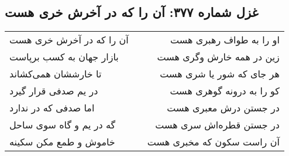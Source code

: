 \begin{center}
\section*{غزل شماره ۳۷۷: آن را که در آخرش خری هست}
\label{sec:0377}
\begin{longtable}{l p{0.5cm} r}
آن را که در آخرش خری هست
&&
او را به طواف رهبری هست
\\
بازار جهان به کسب برپاست
&&
زین در همه خارش وگری هست
\\
تا خارششان همی‌کشاند
&&
هر جای که شور یا شری هست
\\
در یم صدفی قرار گیرد
&&
کو را به درونه گوهری هست
\\
اما صدفی که در ندارد
&&
در جستن درش معبری هست
\\
گه در یم و گاه سوی ساحل
&&
در جستن قطره‌اش سری هست
\\
خاموش و طمع مکن سکینه
&&
آن راست سکون که مخبری هست
\\
\end{longtable}
\end{center}

